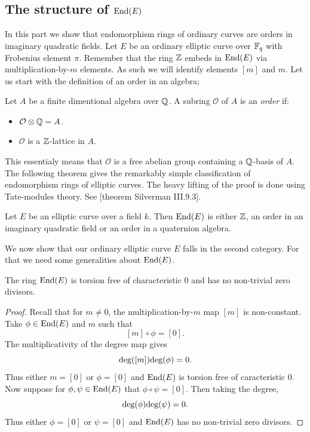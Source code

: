 \documentclass[../main/main.tex]{subfiles}
\begin{document}
\subsection{The structure of $\text{End}(E)$}
In this part we show that endomorphism rings of ordinary curves are orders in imaginary quadratic fields.
Let $E$ be an ordinary elliptic curve over $\mathbb{F}_q$ with Frobenius element $\pi$.
Remember that the ring $\mathbb{Z}$ embeds in $\text{End}(E)$ via multiplication-by-$m$ elements.
As such we will identify elements $[m]$ and $m$.
Let us start with the definition of an order in an algebra;
\begin{definition}
	Let $A$ be a finite dimentional algebra over $\mathbb{Q}$. A subring $\mathcal{O}$ of $A$ is an \textit{order} if:
	\begin{itemize}
		\item $\mathcal{O}\otimes\mathbb{Q} = A$.
		\item $\mathcal{O}$ is a $\mathbb{Z}$-lattice in $A$.
	\end{itemize}
\end{definition}
This essentialy means that $\mathcal{O}$ is a free abelian group containing a $\mathbb{Q}$-basis of $A$.
The following theorem gives the remarkably simple classification of endomorphism rings of elliptic curves.
The heavy lifting of the proof is done using Tate-modules theory.
See [theorem Silverman III.9.3].
\begin{theorem}
	Let $E$ be an elliptic curve over a field $k$.
	Then $\text{End}(E)$ is either $\mathbb{Z}$, an order in an imaginary quadratic field or an order in a quaternion algebra.
\end{theorem}
We now show that our ordinary elliptic curve $E$ falls in the second category.
For that we need some generalities about $\text{End}(E)$.
\begin{proposition}
	The ring $\text{End}(E)$ is torsion free of characteristic $0$ and has no non-trivial zero divisors.
\end{proposition}
\begin{proof}
	Recall that for $m\neq 0$, the multiplication-by-$m$ map $[m]$ is non-constant.
	Take $\phi\in\text{End}(E)$ and $m$ such that
	\[
		[m]\circ\phi = [0].
	\]
	The multiplicativity of the degree map gives
	\[
		\text{deg}([m])\text{deg}(\phi) = 0.
	\]
	Thus either $m = [0]$ or $\phi = [0]$ and $\text{End}(E)$ is torsion free of caracteristic $0$.
	Now suppose for $\phi, \psi\in\text{End}(E)$ that $\phi\circ\psi = [0]$.
	Then taking the degree,
	\[\text{deg}(\phi)\text{deg}(\psi) = 0.\]
	Thus either $\phi = [0]$ or $\psi = [0]$ and $\text{End}(E)$ has no non-trivial zero divisors.
\end{proof}
\end{document}
